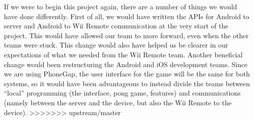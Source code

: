 \documentclass[12pt]{article}
\newenvironment{itemize*}%
  {\begin{itemize}%
  	\setlength{\parsep}{0pt}
    \setlength{\itemsep}{0pt}%
    \setlength{\parskip}{0pt}}%
  {\end{itemize}}
\begin{document}
\begin{itemize*}
If we were to begin this project again, there are a number of things we would have done differently.  First of all, we would have written the APIs for Android to server and Android to Wii Remote communication at the very start of the project.  This would have allowed our team to more forward, even when the other teams were stuck.  This change would also have helped us be clearer in our expectations of what we needed from the Wii Remote team.  Another beneficial change would been restructuring the Android and iOS development teams.  Since we are using PhoneGap, the user interface for the game will be the same for both systems, so it would have been advantageous to instead divide the teams between “local” programming (the interface, pong game, features) and communications (namely between the server and the device, but also the Wii Remote to the device). 
>>>>>>> upstream/master


\end{itemize*}
\end{document}
